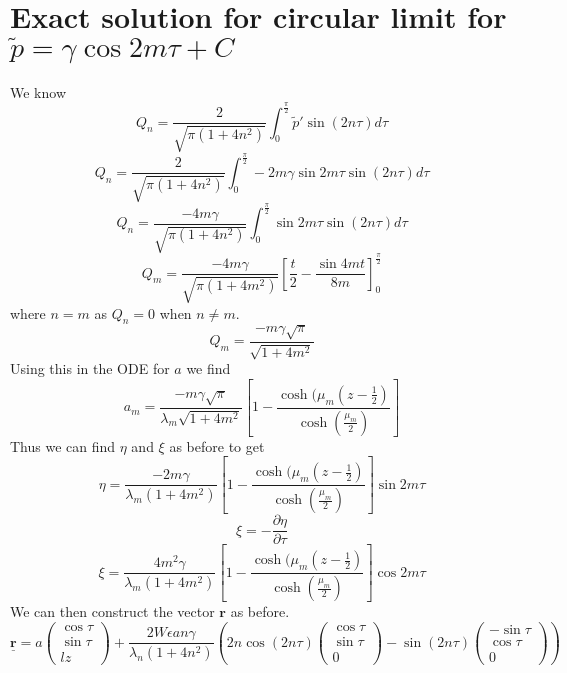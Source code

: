 \documentclass[12pt]{article}
\begin{document}
\section{Exact solution for circular limit for $\tilde{p}=\gamma\cos2m\tau + C$}
We know $$Q_n=\frac{2}{\sqrt{\pi(1+4n^2)}}\int_0^{\frac{\pi}{2}}\tilde{p}'\sin(2n\tau)d\tau$$
$$Q_n=\frac{2}{\sqrt{\pi(1+4n^2)}}\int_0^{\frac{\pi}{2}}-2m\gamma\sin2m\tau\sin(2n\tau)d\tau$$
$$Q_n=\frac{-4m\gamma}{\sqrt{\pi(1+4n^2)}}\int_0^{\frac{\pi}{2}}\sin2m\tau\sin(2n\tau)d\tau$$
$$Q_m=\frac{-4m\gamma}{\sqrt{\pi(1+4m^2)}}\left[\frac{t}{2}-\frac{\sin4mt}{8m}\right]_0^{\frac{\pi}{2}}$$ where $n=m$ as $Q_n=0$ when $n\neq m$.
$$Q_m=\frac{-m\gamma\sqrt{\pi}}{\sqrt{1+4m^2}}$$
Using this in the ODE for $a$ we find $$a_m=\frac{-m\gamma\sqrt{\pi}}{\lambda_m\sqrt{1+4m^2}}\left[1-\frac{\cosh(\mu_m(z-\frac{1}{2})}{\cosh(\frac{\mu_m}{2})}\right]$$
Thus we can find $\eta$ and $\xi$ as before to get
$$\eta=\frac{-2m\gamma}{\lambda_m(1+4m^2)}\left[1-\frac{\cosh(\mu_m(z-\frac{1}{2})}{\cosh(\frac{\mu_m}{2})}\right]\sin2m\tau$$
$$\xi=-\frac{\partial \eta}{\partial \tau}$$
$$\xi=\frac{4m^2\gamma}{\lambda_m(1+4m^2)}\left[1-\frac{\cosh(\mu_m(z-\frac{1}{2})}{\cosh(\frac{\mu_m}{2})}\right]\cos2m\tau$$
We can then construct the vector $\mathbf{r}$ as before.
$$\underline{\textbf{r}}= a\begin{pmatrix}
\cos\tau \\ \sin\tau \\ lz
\end{pmatrix} + \frac{2W\epsilon an\gamma}{\lambda_n(1+4n^2)}\left(2n\cos(2n\tau)\begin{pmatrix}
\cos\tau \\ \sin\tau \\ 0
\end{pmatrix} - \sin(2n\tau)\begin{pmatrix}
-\sin\tau \\ \cos\tau \\ 0
\end{pmatrix}\right)$$
\end{document}
